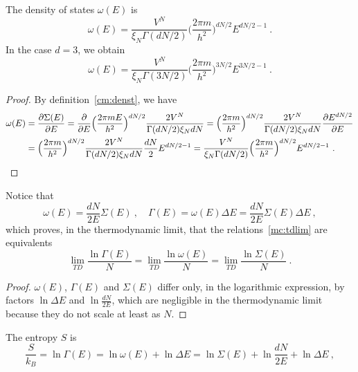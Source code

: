     The density of states $\omega(E)$ is
    \begin{equation}\label{freegas}
        \omega (E) = \frac{V^N}{\xi_N \Gamma(dN/2)} \Big ( \frac{2 \pi m}{h^2} \Big )^{dN/2} E^{dN/2-1} ~.
    \end{equation}
    In the case $d = 3$, we obtain  
    \begin{equation*}
        \omega (E) = \frac{V^N}{\xi_N \Gamma(3N/2)} \Big ( \frac{2 \pi m}{h^2} \Big )^{3N/2} E^{3N/2-1} ~.
    \end{equation*}
    \begin{proof}
        By definition~\eqref{cm:denst}, we have
        \begin{equation*}
        \begin{aligned}
            \omega (E) &= \frac{\partial\Sigma (E)}{\partial E} = \frac{\partial}{\partial E} \Big (\frac{2 \pi m E}{h^2} \Big)^{dN/2} \frac{2 V^N}{\Gamma (dN/2)\xi_N d N} = \Big (\frac{2 \pi m}{h^2} \Big)^{dN/2} \frac{2 V^N}{\Gamma (dN/2)\xi_N d N} \frac{\partial E^{dN/2}}{\partial E} \\ & = \Big (\frac{2 \pi m}{h^2} \Big)^{dN/2} \frac{2 V^N}{\Gamma (dN/2)\xi_N d N} \frac{dN}{2} E^{dN/2 - 1} = \frac{V^N}{\xi_N \Gamma(dN/2)} \Big ( \frac{2 \pi m}{h^2} \Big )^{dN/2} E^{dN/2-1} ~.
        \end{aligned}
        \end{equation*}
    \end{proof}
    Notice that 
    \begin{equation*}
        \omega(E) = \frac{dN}{2E} \Sigma(E) ~, \quad \Gamma(E) = \omega(E) \Delta E = \frac{dN}{2E} \Sigma(E) \Delta E ~,
    \end{equation*}
    which proves, in the thermodynamic limit, that the relations~\eqref{mc:tdlim} are equivalents
    \begin{equation*}
        \lim_{TD} \frac{\ln \Gamma (E)}{N} = \lim_{TD} \frac{\ln \omega (E)}{N} = \lim_{TD} \frac{\ln \Sigma (E)}{N} ~.
    \end{equation*}
    \begin{proof}
        $\omega(E)$, $\Gamma(E)$ and $\Sigma(E)$ differ only, in the logarithmic expression, by factors $\ln \Delta E$ and $\ln \frac{dN}{2E}$, which are negligible in the thermodynamic limit because they do not scale at least as $N$.
    \end{proof}
    The entropy $S$ is
    \begin{equation*}
        \frac{S}{k_B} = \ln \Gamma(E) = \ln \omega(E) + \ln \Delta E = \ln \Sigma(E) + \ln \frac{dN}{2E} + \ln \Delta E ~,
    \end{equation*}
